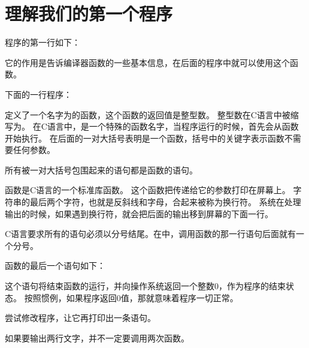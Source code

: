 \section{理解我们的第一个程序}
{
    程序的第一行如下：

    \begin{codelist}
        
    \end{codelist}

    它的作用是告诉编译器函数的一些基本信息，在后面的程序中就可以使用这个函数。

    下面的一行程序：

    \begin{codelist}
        
    \end{codelist}

    定义了一个名字为的函数，这个函数的返回值是整型数。
    整型数在C语言中被缩写为。
    在C语言中，是一个特殊的函数名字，当程序运行的时候，首先会从函数开始执行。
    在后面的一对大括号表明是一个函数，括号中的关键字表示函数不需要任何参数。

    所有被一对大括号包围起来的语句都是函数的语句。

    函数是C语言的一个标准库函数。
    这个函数把传递给它的参数打印在屏幕上。
    字符串的最后两个字符，也就是反斜线和字母，合起来被称为换行符。
    系统在处理输出的时候，如果遇到换行符，就会把后面的输出移到屏幕的下面一行。

    C语言要求所有的语句必须以分号结尾。在中，调用函数的那一行语句后面就有一个分号。

    函数的最后一个语句如下：

    \begin{codelist}
        
    \end{codelist}

    这个语句将结束函数的运行，并向操作系统返回一个整数0，作为程序的结束状态。
    按照惯例，如果程序返回0值，那就意味着程序一切正常。

    尝试修改程序，让它再打印出一条语句。

    \begin{codelist}
        
    \end{codelist}

    如果要输出两行文字，并不一定要调用两次函数。

    \begin{codelist}
        
    \end{codelist}
}

\endinput
